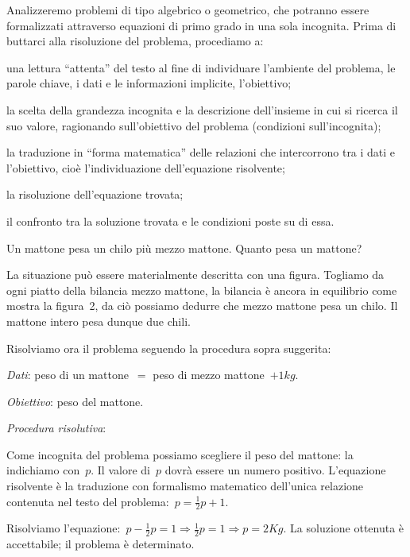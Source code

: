 Analizzeremo problemi di tipo algebrico o geometrico, che potranno
essere formalizzati attraverso equazioni di primo grado in una sola
incognita. Prima di buttarci alla risoluzione del problema, procediamo
a:

\begin{enumeratea}
\item una lettura ``attenta'' del
testo al fine di individuare l'ambiente del problema,
le parole chiave, i dati e le informazioni implicite,
l'obiettivo;
\item la scelta della grandezza incognita e la descrizione
dell'insieme in cui si ricerca il suo valore,
ragionando sull'obiettivo del problema (condizioni sull'incognita);
\item la traduzione in ``forma matematica'' delle relazioni che intercorrono tra 
i
dati e l'obiettivo, cioè l'individuazione dell'equazione risolvente;
\item la risoluzione dell'equazione trovata;
\item il confronto tra la soluzione trovata e le condizioni poste su di essa.
\end{enumeratea}

\begin{problema}
 Un mattone pesa un chilo più mezzo mattone. Quanto pesa un mattone?
\end{problema}

\begin{soluzione}
 La situazione può essere materialmente descritta con una figura.
Togliamo da ogni piatto della bilancia mezzo mattone, la bilancia è
ancora in equilibrio come mostra la figura~2, da ciò possiamo
dedurre che mezzo mattone pesa un chilo. Il mattone intero pesa dunque
due chili.
\begin{center}
 
\end{center}

Risolviamo ora il problema seguendo la procedura sopra suggerita:

\emph{Dati}: peso di un mattone~\(=\) peso di mezzo mattone~\(+ 1\unit{kg}.\)

\emph{Obiettivo}: peso del mattone.

\emph{Procedura risolutiva}:

Come incognita del problema possiamo scegliere il peso del mattone: la
indichiamo con~\(p\).
Il valore di~\(p\) dovrà essere un numero positivo.
L'equazione risolvente è la traduzione con formalismo
matematico dell'unica relazione contenuta nel testo del
problema:~\(p=\frac{1}{2}p+1\).

Risolviamo l'equazione:~\(p-\frac{1}{2}p=1\Rightarrow\frac{1}{2}p=1\Rightarrow 
p=2\unit{Kg}.\)
La soluzione ottenuta è accettabile; il problema è determinato.
\end{soluzione}

